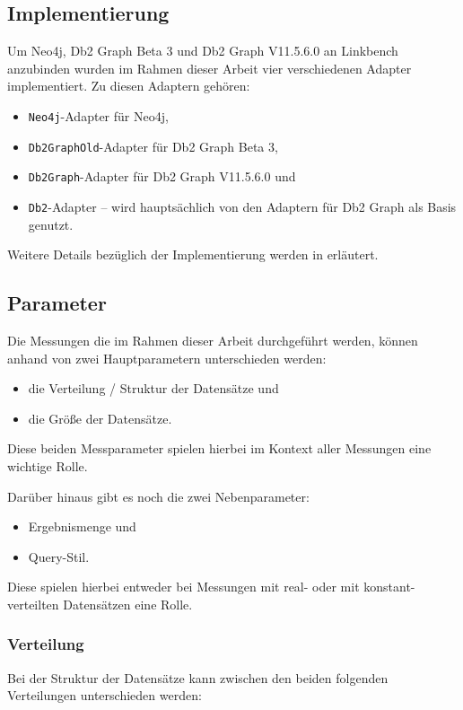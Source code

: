 \subsection{Implementierung}
Um Neo4j, Db2 Graph Beta 3 und Db2 Graph V11.5.6.0 an Linkbench anzubinden wurden im Rahmen dieser Arbeit vier verschiedenen Adapter implementiert. Zu diesen Adaptern gehören:
\begin{itemize}
    \item \texttt{Neo4j}-Adapter für Neo4j,
    \item \texttt{Db2GraphOld}-Adapter für Db2 Graph Beta 3, 
    \item \texttt{Db2Graph}-Adapter für Db2 Graph V11.5.6.0 und
    \item \texttt{Db2}-Adapter -- wird hauptsächlich von den Adaptern für Db2 Graph als Basis genutzt.
\end{itemize}
Weitere Details bezüglich der Implementierung werden in  erläutert.

\subsection{Parameter}
Die Messungen die im Rahmen dieser Arbeit durchgeführt werden, können anhand von zwei Hauptparametern unterschieden werden:
\begin{itemize}
    \item die Verteilung / Struktur der Datensätze und 
    \item die Größe der Datensätze. 
\end{itemize}
Diese beiden Messparameter spielen hierbei im Kontext aller Messungen eine wichtige Rolle. 

Darüber hinaus gibt es noch die zwei Nebenparameter:
\begin{itemize}
    \item Ergebnismenge und 
    \item Query-Stil. 
\end{itemize}
Diese spielen hierbei entweder bei Messungen mit real- oder mit konstant-verteilten Datensätzen eine Rolle.  

\subsubsection{Verteilung}
Bei der Struktur der Datensätze kann zwischen den beiden folgenden Verteilungen unterschieden werden: 

